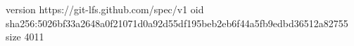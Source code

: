 version https://git-lfs.github.com/spec/v1
oid sha256:5026bf33a2648a0f21071d0a92d55df195beb2eb6f44a5fb9edbd36512a82755
size 4011
